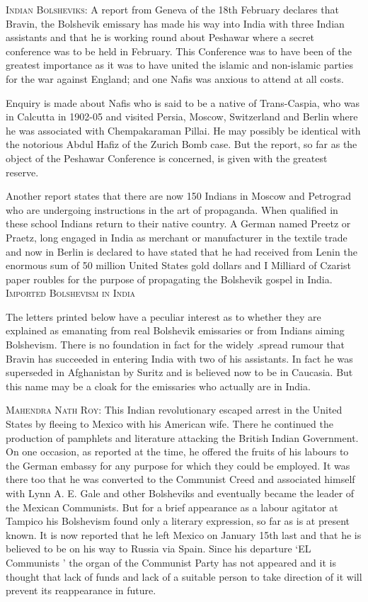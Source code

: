 \textsc{Indian Bolsheviks:} A report from Geneva of the 18th February declares that Bravin, the Bolshevik emissary has made his way into India with three Indian assistants and that he is working round about Peshawar where a secret conference was to be held in February. This Conference was to have been of the greatest importance as it was to have united the islamic and non-islamic parties for the war against England; and one Nafis was anxious to attend at 
all costs. 

Enquiry is made about Nafis who is said to be a native 
of Trans-Caspia, who was in Calcutta in 1902-05 and visited Persia, Moscow, Switzerland and Berlin where he was associated with Chempakaraman Pillai. He may possibly be identical with the notorious Abdul Hafiz of the Zurich Bomb case. But the report, so far as the object of the Peshawar Conference is concerned, is given with the greatest reserve. 

Another report states that there are now 150 Indians in Moscow and Petrograd who are undergoing instructions in the art of propaganda. When qualified in these school Indians 
return to their native country. A German named Preetz or Praetz, long engaged in India as merchant or manufacturer in the textile trade and now in Berlin is declared to have stated that he had received from Lenin the enormous sum of 50 million United States gold dollars and I Milliard of Czarist paper roubles for the purpose of propagating the Bolshevik gospel in India. \\

\textsc{Imported Bolshevism in India}

The letters printed below have a peculiar interest as to whether they are explained as emanating from real Bolshevik emissaries or from Indians aiming Bolshevism. There is no foundation in fact for the widely .spread rumour that Bravin has succeeded in entering India with two of his assistants. In fact he was superseded in Afghanistan by Suritz and is believed now to be in Caucasia. But this name may be a cloak for the emissaries who actually are in India. 

\textsc{Mahendra Nath Roy:} This Indian revolutionary escaped arrest in the United States by fleeing to Mexico with his American wife. There he continued the production of pamphlets and literature attacking the British Indian Government. On one occasion, as reported at the time, he offered the fruits of his labours to the German embassy for any purpose for which they could be employed. It was there too that he was 
converted to the Communist Creed and associated himself with Lynn A. E. Gale and other Bolsheviks and eventually became the leader of the Mexican Communists. But for a brief appearance as a labour agitator at Tampico his Bolshevism found only a literary expression, so far as is at present known. It is now reported that he left Mexico on January 15th last and that he is believed to be on his way to Russia via Spain. 
Since his departure ‘EL Communists ’ the organ of the Communist Party has not appeared and it is thought that lack of funds and lack of a suitable person to take direction of it will prevent its reappearance in future. 



